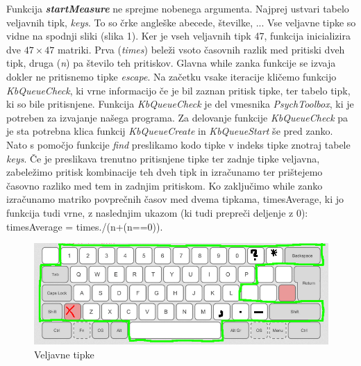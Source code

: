 \documentclass[12pt]{article}
\begin{document}
Funkcija \textbf{\textit{startMeasure}} ne sprejme nobenega argumenta.
Najprej ustvari tabelo veljavnih tipk, \textit{keys}.
To so črke angleške abecede, številke, ... Vse veljavne tipke so vidne na spodnji sliki (slika 1).
Ker je vseh veljavnih tipk 47, funkcija inicializira dve $47\times 47$ matriki. 
Prva (\textit{times}) beleži vsoto časovnih razlik med pritiski dveh tipk, druga (\textit{n}) pa število teh pritiskov. 
Glavna while zanka funkcije se izvaja dokler ne pritisnemo tipke \textit{escape}. 
Na začetku vsake iteracije kličemo funkcijo \textit{KbQueueCheck}, ki vrne informacijo če je bil zaznan pritisk tipke, 
ter tabelo tipk, ki so bile pritisnjene. Funkcija \textit{KbQueueCheck} je del vmesnika \textit{PsychToolbox}, 
ki je potreben za izvajanje našega programa. Za delovanje funkcije \textit{KbQueueCheck} pa je sta potrebna klica 
funkcij \textit{KbQueueCreate} in \textit{KbQueueStart} še pred zanko. Nato s pomočjo funkcije \textit{find} 
preslikamo kodo tipke v indeks tipke znotraj tabele \textit{keys}. Če je preslikava trenutno pritisnjene tipke 
ter zadnje tipke veljavna, zabeležimo pritisk kombinacije teh dveh tipk in izračunamo ter prištejemo časovno 
razliko med tem in zadnjim pritiskom. Ko zaključimo while zanko izračunamo matriko povprečnih časov med dvema 
tipkama, timesAverage, ki jo funkcija tudi vrne, z naslednjim ukazom (ki tudi prepreči deljenje z 0): 
timesAverage = times./(n+(n==0)).

\begin{figure}[h]
  \centering
  \label{slika1}
  \includegraphics[scale=1.5]{keyboard}
  \caption{Veljavne tipke}
\end{figure}
\end{document}

